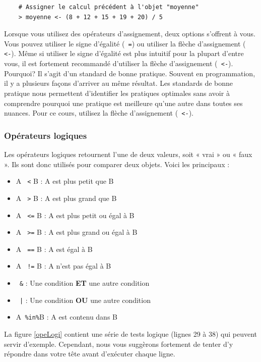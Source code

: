 \documentclass[10.5pt,a4paper]{article}
\newcommand{\rcode}[1]{\texttt{\color{rstudio} #1}}
\begin{document}
  \begin{lstlisting}
    # Assigner le calcul précédent à l'objet "moyenne"
    > moyenne <- (8 + 12 + 15 + 19 + 20) / 5
  \end{lstlisting}

Lorsque vous utilisez des opérateurs d'assignement, deux options s'offrent à vous. Vous pouvez utiliser le signe d'égalité (\rcode{=}) ou utiliser la flèche d'assignement (\rcode{<-}). Même si utiliser le signe d'égalité est plus intuitif pour la plupart d'entre vous, il est fortement recommandé d'utiliser la flèche d'assignement (\rcode{<-}). Pourquoi? Il s'agit d'un standard de bonne pratique. Souvent en programmation, il y a plusieurs façons d'arriver au même résultat. Les standards de bonne pratique nous permettent d'identifier les pratiques optimales sans avoir à comprendre pourquoi une pratique est meilleure qu'une autre dans toutes ses nuances. Pour ce cours, utilisez la flèche d'assignement (\rcode{<-}). 
    
    \subsubsection{Opérateurs logiques}
    Les opérateurs logiques retournent l'une de deux valeurs, soit « vrai » ou « faux ». Ils sont donc utilisés pour comparer deux objets. Voici les principaux : 
    \begin{itemize}
      \item A \rcode{<} B    : A est plus petit que B
      \item A \rcode{>} B    : A est plus grand que B
      \item A \rcode{<=} B   : A est plus petit ou égal à B
      \item A \rcode{>=} B   : A est plus grand ou égal à B
      \item A \rcode{==} B   : A est égal à B
      \item A \rcode{!=} B   : A n'est pas égal à B
      \item \rcode{\&}       : Une condition \textbf{ET} une autre condition
      \item \rcode{|}        : Une condition \textbf{OU} une autre condition
      \item A\rcode{\%in\%}B : A est contenu dans B
    \end{itemize}
    
    La figure \ref{opeLogi} contient une série de tests logique (lignes 29 à 38) qui peuvent servir d'exemple. Cependant, nous vous suggèrons fortement de tenter d'y répondre dans votre tête avant d'exécuter chaque ligne. 
   
\end{document}
